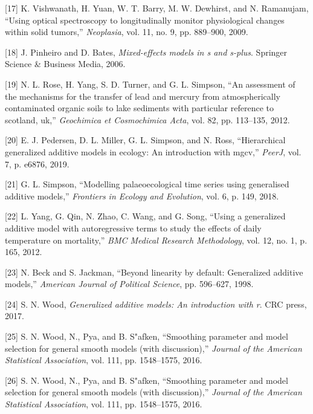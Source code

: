 \documentclass[
]{article}
\begin{document}
\leavevmode\hypertarget{ref-vishwanath2009}{}%
{[}17{]} K. Vishwanath, H. Yuan, W. T. Barry, M. W. Dewhirst, and N. Ramanujam, ``Using optical spectroscopy to longitudinally monitor physiological changes within solid tumors,'' \emph{Neoplasia}, vol. 11, no. 9, pp. 889--900, 2009.

\leavevmode\hypertarget{ref-pinheiro2006}{}%
{[}18{]} J. Pinheiro and D. Bates, \emph{Mixed-effects models in s and s-plus}. Springer Science \& Business Media, 2006.

\leavevmode\hypertarget{ref-rose2012}{}%
{[}19{]} N. L. Rose, H. Yang, S. D. Turner, and G. L. Simpson, ``An assessment of the mechanisms for the transfer of lead and mercury from atmospherically contaminated organic soils to lake sediments with particular reference to scotland, uk,'' \emph{Geochimica et Cosmochimica Acta}, vol. 82, pp. 113--135, 2012.

\leavevmode\hypertarget{ref-pedersen2019}{}%
{[}20{]} E. J. Pedersen, D. L. Miller, G. L. Simpson, and N. Ross, ``Hierarchical generalized additive models in ecology: An introduction with mgcv,'' \emph{PeerJ}, vol. 7, p. e6876, 2019.

\leavevmode\hypertarget{ref-simpson2018}{}%
{[}21{]} G. L. Simpson, ``Modelling palaeoecological time series using generalised additive models,'' \emph{Frontiers in Ecology and Evolution}, vol. 6, p. 149, 2018.

\leavevmode\hypertarget{ref-yang2012}{}%
{[}22{]} L. Yang, G. Qin, N. Zhao, C. Wang, and G. Song, ``Using a generalized additive model with autoregressive terms to study the effects of daily temperature on mortality,'' \emph{BMC Medical Research Methodology}, vol. 12, no. 1, p. 165, 2012.

\leavevmode\hypertarget{ref-beck1998}{}%
{[}23{]} N. Beck and S. Jackman, ``Beyond linearity by default: Generalized additive models,'' \emph{American Journal of Political Science}, pp. 596--627, 1998.

\leavevmode\hypertarget{ref-wood2017}{}%
{[}24{]} S. N. Wood, \emph{Generalized additive models: An introduction with r}. CRC press, 2017.

\leavevmode\hypertarget{ref-wood2011}{}%
{[}25{]} S. N. Wood, N., Pya, and B. S"afken, ``Smoothing parameter and model selection for general smooth models (with discussion),'' \emph{Journal of the American Statistical Association}, vol. 111, pp. 1548--1575, 2016.

\leavevmode\hypertarget{ref-wood2016}{}%
{[}26{]} S. N. Wood, N., Pya, and B. S"afken, ``Smoothing parameter and model selection for general smooth models (with discussion),'' \emph{Journal of the American Statistical Association}, vol. 111, pp. 1548--1575, 2016.
\end{document}
